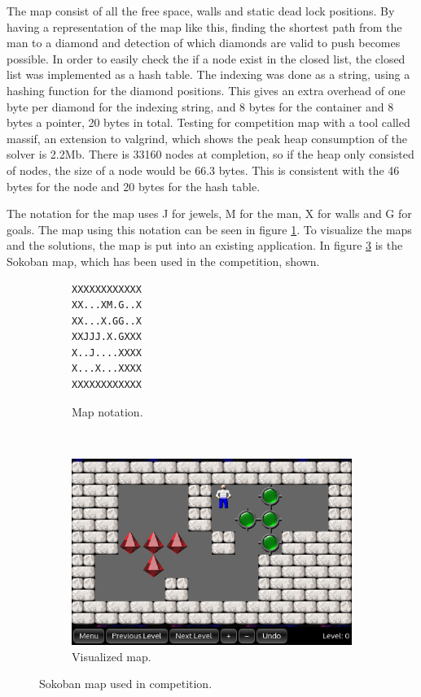 The map consist of all the free space, walls and static dead lock positions.
By having a representation of the map like this, finding the shortest path from the man to a diamond and detection of which diamonds are valid to push becomes possible.
In order to easily check the if a node exist in the closed list, the closed list was implemented as a hash table.
The indexing was done as a string, using a hashing function for the diamond positions.
This gives an extra overhead of one byte per diamond for the indexing string, and 8 bytes for the container and 8 bytes a pointer, 20 bytes in total.
Testing for competition map with a tool called massif, an extension to valgrind, which shows the peak heap consumption of the solver is 2.2Mb.
There is 33160 nodes at completion, so if the heap only consisted of nodes, the size of a node would be 66.3 bytes.
This is consistent with the 46 bytes for the node and 20 bytes for the hash table.

The notation for the map uses J for jewels, M for the man, X for walls and G for goals.
The map using this notation can be seen in figure \ref{fig:map_notation}.
To visualize the maps and the solutions, the map is put into an existing application\cite{url:qml-sokoban}.
In figure \ref{fig:sokoban_map_2015_img} is the Sokoban map, which has been used in the competition, shown.

\begin{figure}[h]
 \centering
 \begin{subfigure}[b]{0.16\textwidth}
   \begin{minipage}{\linewidth}
\begin{verbatim}
XXXXXXXXXXXX
XX...XM.G..X
XX...X.GG..X
XXJJJ.X.GXXX
X..J....XXXX
X...X...XXXX
XXXXXXXXXXXX
\end{verbatim}
 \end{minipage}
 \caption{Map notation.}
 \label{fig:map_notation}
 \end{subfigure}~~~
 \begin{subfigure}[b]{0.3\textwidth}
  \includegraphics[width=\linewidth]{img/sokoban_2015}
 \caption{Visualized map.}
 \label{fig:sokoban_map_2015_img}
 \end{subfigure}
 \caption{Sokoban map used in competition.}
\end{figure}

